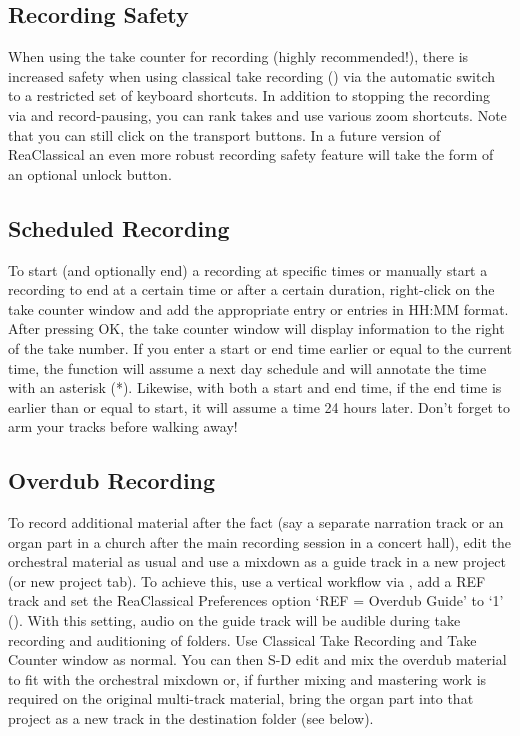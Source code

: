 \documentclass[10pt,american]{article}
\begin{document}
\subsection{Recording Safety}

When using the take counter for recording (highly recommended!), there is
increased safety when using classical take recording () via the
automatic switch to a restricted set of keyboard shortcuts. In addition to
stopping the recording via  and record-pausing, you can rank takes and
use various zoom shortcuts. Note that you can still click on the transport
buttons. In a future version of ReaClassical an even more robust recording
safety feature will take the form of an optional unlock button.

\subsection{Scheduled Recording}

To start (and optionally end) a recording at specific times or manually start a
recording to end at a certain time or after a certain duration, right-click on
the take counter window and add the appropriate entry or entries in HH:MM
format. After pressing OK, the take counter window will display information to
the right of the take number. If you enter a start or end time earlier or equal
to the current time, the function will assume a next day schedule and will
annotate the time with an asterisk ({*}). Likewise, with both a start and end
time, if the end time is earlier than or equal to start, it will assume a time
24 hours later. Don't forget to arm your tracks before walking away!

\subsection{Overdub Recording}

To record additional material after the fact (say a separate narration track or
an organ part in a church after the main recording session in a concert hall),
edit the orchestral material as usual and use a mixdown as a guide track in a
new project (or new project tab). To achieve this, use a vertical workflow via
, add a REF track  and set the ReaClassical Preferences option
`REF = Overdub Guide' to `1' (). With this setting, audio on the guide
track will be audible during take recording and auditioning of folders. Use
Classical Take Recording  and Take Counter window \keys{\ctrl+\enter}
as normal. You can then S-D edit and mix the overdub material to fit with the
orchestral mixdown or, if further mixing and mastering work is required on the
original multi-track material, bring the organ part into that project as a new
track in the destination folder  (see below).
\end{document}
